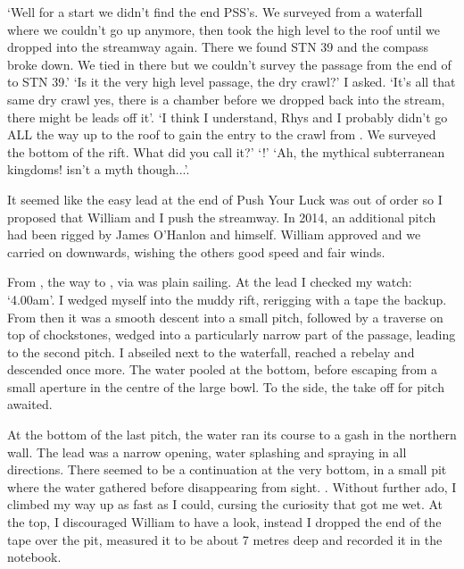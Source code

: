 `Well for a start we didn't find the end PSS's. We surveyed from a waterfall where we couldn't go up anymore, then took the high level to the roof until we dropped into the streamway again. There we found  STN 39 and the compass broke down. We tied in there but we couldn't survey the passage from the end of  to STN 39.'
`Is it the very high level passage, the dry crawl?' I asked.
`It's all that same dry crawl yes, there is a chamber before we dropped back into the stream, there might be leads off it'.
`I think I understand, Rhys and I probably didn't go ALL the way up to the roof to gain the entry to the crawl from . We surveyed the bottom of the rift. What did you call it?'
`!'
`Ah, the mythical subterranean kingdoms!  isn't a myth though...'.


It seemed like the easy lead at the end of Push Your Luck was out of order so I proposed that William and I push the  streamway. In 2014, an additional pitch had been rigged by James O'Hanlon and himself. William approved and we carried on downwards, wishing the others good speed and fair winds.

From , the way to , via  was plain sailing. At the lead I checked my watch: `4.00am'. I wedged myself into the muddy rift, rerigging with a tape the backup. From then it was a smooth descent into a small pitch, followed by a traverse on top of chockstones, wedged into a particularly narrow part of the passage, leading to the second pitch. I abseiled next to the waterfall, reached a rebelay and descended once more. The water pooled at the bottom, before escaping from a small aperture in the centre of the large bowl. To the side, the take off for  pitch awaited.

At the bottom of the last pitch, the water ran its course to a gash in the northern wall. The lead was a narrow opening, water splashing and spraying in all directions. There seemed to be a continuation at the very bottom, in a small pit where the water gathered before disappearing from sight. . Without further ado, I climbed my way up as fast as I could, cursing the curiosity that got me wet. At the top, I discouraged William to have a look, instead I dropped the end of the tape over the pit, measured it to be about 7 metres deep and recorded it in the notebook.

